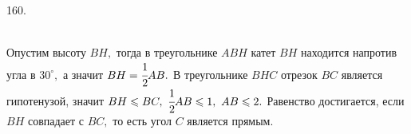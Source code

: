 160. \begin{figure}[ht!]
\end{figure}\\
Опустим высоту $BH,$ тогда в треугольнике $ABH$ катет $BH$ находится напротив угла в $30^\circ,$ а значит $BH=\cfrac{1}{2}AB.$ В треугольнике $BHC$ отрезок $BC$ является гипотенузой, значит $BH\leqslant BC,\ \cfrac{1}{2}AB \leqslant 1,\ AB \leqslant2.$ Равенство достигается, если $BH$ совпадает с $BC,$ то есть угол $C$ является прямым.\\
